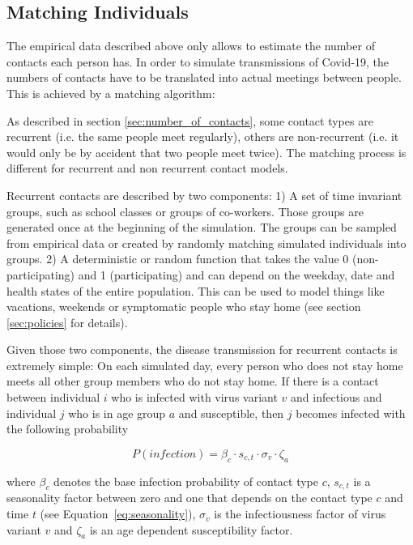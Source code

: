 \subsection{Matching Individuals}
\label{sec:matching}

The empirical data described above only allows to estimate the number of contacts each
person has. In order to simulate transmissions of Covid-19, the numbers of contacts have
to be translated into actual meetings between people. This is achieved by a matching
algorithm:

As described in section \ref{sec:number_of_contacts}, some contact types are recurrent
(i.e. the same people meet regularly), others are non-recurrent (i.e. it would only be
by accident that two people meet twice). The matching process is different for recurrent
and non recurrent contact models.

Recurrent contacts are described by two components: 1) A set of time invariant groups,
such as school classes or groups of co-workers. Those groups are generated once at the
beginning of the simulation. The groups can be sampled from empirical data or created by
randomly matching simulated individuals into groups. 2) A deterministic or random
function that takes the value 0 (non-participating) and 1 (participating) and can depend
on the weekday, date and health states of the entire population. This can be used to
model things like vacations, weekends or symptomatic people who stay home (see section
\ref{sec:policies} for details).

Given those two components, the disease transmission for recurrent contacts is extremely
simple: On each simulated day, every person who does not stay home meets all other group
members who do not stay home. If there is a contact between individual $i$ who is
infected with virus variant $v$ and infectious and individual $j$ who is in age group
$a$ and susceptible, then $j$ becomes infected with the following probability

\begin{equation}
    \label{eq:infection_probability_formula}
    P(infection) = \beta_c \cdot s_{c, t} \cdot \sigma_v \cdot \zeta_a
\end{equation}

where $\beta_c$ denotes the base infection probability of contact type $c$,
$s_{c, t}$ is a seasonality factor between zero and one that depends on the contact
type $c$ and time $t$ (see Equation~\ref{eq:seasonality}), $\sigma_v$ is the
infectiousness factor of virus variant $v$ and $\zeta_a$ is an age dependent
susceptibility factor.

